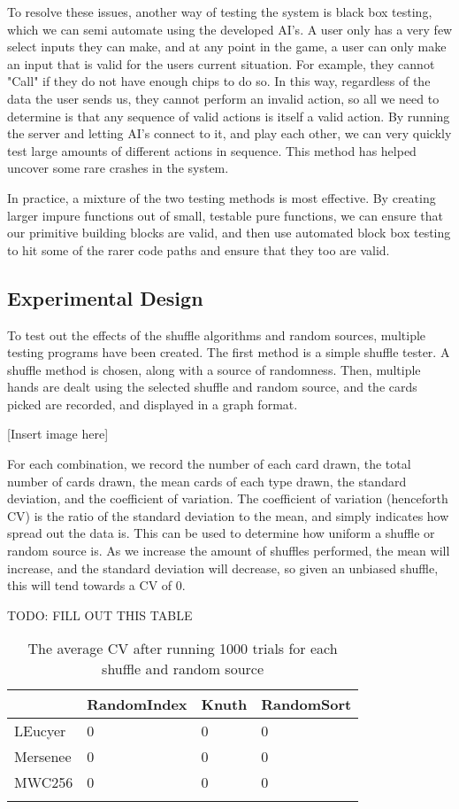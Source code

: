 To resolve these issues, another way of testing the system is black box
testing, which we can semi automate using the developed AI's. A user only
has a very few select inputs they can make, and at any point in the game,
a user can only make an input that is valid for the users current situation.
For example, they cannot "Call" if they do not have enough chips to do so.
In this way, regardless of the data the user sends us, they cannot perform
an invalid action, so all we need to determine is that any sequence of valid
actions is itself a valid action. By running the server and letting AI's
connect to it, and play each other, we can very quickly test large amounts
of different actions in sequence. This method has helped uncover some rare
crashes in the system.

In practice, a mixture of the two testing methods is most effective. By
creating larger impure functions out of small, testable pure functions, we
can ensure that our primitive building blocks are valid, and then use automated
block box testing to hit some of the rarer code paths and ensure that they
too are valid.

\subsection{Experimental Design}
To test out the effects of the shuffle algorithms and random sources, multiple
testing programs have been created. The first method is a simple shuffle
tester. A shuffle method is chosen, along with a source of randomness. Then,
multiple hands are dealt using the selected shuffle and random source, and
the cards picked are recorded, and displayed in a graph format.

[Insert image here]

For each combination, we record the number of each card drawn, the total
number of cards drawn, the mean cards of each type drawn, the standard
deviation, and the coefficient of variation. The coefficient of variation
(henceforth CV) is the ratio of the standard deviation to the mean, and
simply indicates how spread out the data is. This can be used to determine
how uniform a shuffle or random source is. As we increase the amount of
shuffles performed, the mean will increase, and the standard deviation will
decrease, so given an unbiased shuffle, this will tend towards a CV of 0.

TODO: FILL OUT THIS TABLE

\begin{table}[h]
    \centering
    \begin{tabular}{l l l l}
    \toprule
                & RandomIndex   & Knuth & RandomSort  \\
    \midrule
    LEucyer     & 0             & 0     & 0           \\ \addlinespace
    Mersenee    & 0             & 0     & 0           \\ \addlinespace
    MWC256      & 0             & 0     & 0           \\ \addlinespace
    \bottomrule
    \end{tabular}
    \caption{The average CV after running 1000 trials for each shuffle and
             random source}
\end{table}

